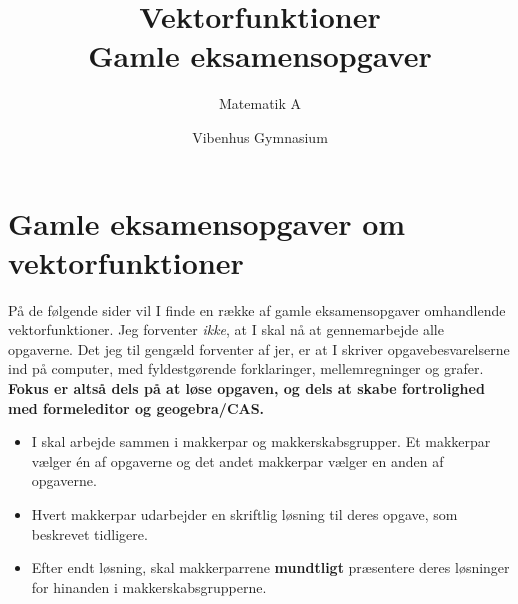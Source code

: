 \documentclass[a4paper, 12pt]{article}
\author{Matematik A}
\date{Vibenhus Gymnasium}
\title{Vektorfunktioner\\\medskip
\large Gamle eksamensopgaver}
\begin{document}
\maketitle


\section*{Gamle eksamensopgaver om vektorfunktioner}
\label{sec:org1d8085f}

På de følgende sider vil I finde en række af gamle eksamensopgaver omhandlende vektorfunktioner. Jeg forventer \emph{ikke}, at I skal nå at gennemarbejde alle opgaverne. Det jeg til gengæld forventer af jer, er at I skriver opgavebesvarelserne ind på computer, med fyldestgørende forklaringer, mellemregninger og grafer. \textbf{Fokus er altså dels på at løse opgaven, og dels at skabe fortrolighed med formeleditor og geogebra/CAS.}

\begin{itemize}
\item I skal arbejde sammen i makkerpar og makkerskabsgrupper. Et makkerpar vælger én af opgaverne og det andet makkerpar vælger en anden af opgaverne.
\item Hvert makkerpar udarbejder en skriftlig løsning til deres opgave, som beskrevet tidligere.
\item Efter endt løsning, skal makkerparrene \textbf{\textbf{mundtligt}} præsentere deres løsninger for hinanden i makkerskabsgrupperne.
\end{itemize}
\end{document}
